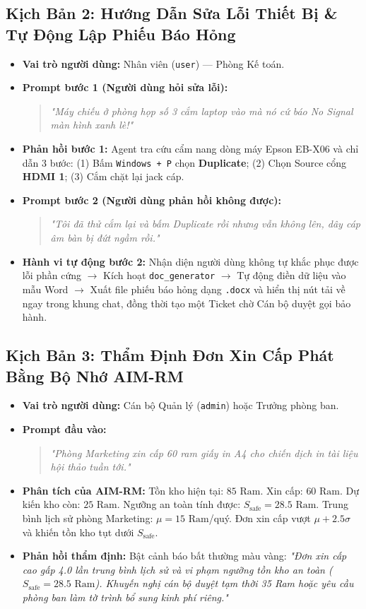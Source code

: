 \documentclass[11pt,a4paper]{article}
\begin{document}
\subsection{Kịch Bản 2: Hướng Dẫn Sửa Lỗi Thiết Bị \& Tự Động Lập Phiếu Báo Hỏng}
\begin{itemize}[leftmargin=1.5em]
    \item \textbf{Vai trò người dùng:} Nhân viên (\texttt{user}) — Phòng Kế toán.
    \item \textbf{Prompt bước 1 (Người dùng hỏi sửa lỗi):}
    \begin{quote}
    \textit{"Máy chiếu ở phòng họp số 3 cắm laptop vào mà nó cứ báo No Signal màn hình xanh lè!"}
    \end{quote}
    \item \textbf{Phản hồi bước 1:} Agent tra cứu cẩm nang dòng máy Epson EB-X06 và chỉ dẫn 3 bước: (1) Bấm \texttt{Windows + P} chọn \textbf{Duplicate}; (2) Chọn Source cổng \textbf{HDMI 1}; (3) Cắm chặt lại jack cáp.
    \item \textbf{Prompt bước 2 (Người dùng phản hồi không được):}
    \begin{quote}
    \textit{"Tôi đã thử cắm lại và bấm Duplicate rồi nhưng vẫn không lên, dây cáp âm bàn bị đứt ngầm rồi."}
    \end{quote}
    \item \textbf{Hành vi tự động bước 2:} Nhận diện người dùng không tự khắc phục được lỗi phần cứng $\rightarrow$ Kích hoạt \texttt{doc\_generator} $\rightarrow$ Tự động điền dữ liệu vào mẫu Word $\rightarrow$ Xuất file phiếu báo hỏng dạng \texttt{.docx} và hiển thị nút tải về ngay trong khung chat, đồng thời tạo một Ticket chờ Cán bộ duyệt gọi bảo hành.
\end{itemize}

\subsection{Kịch Bản 3: Thẩm Định Đơn Xin Cấp Phát Bằng Bộ Nhớ AIM-RM}
\begin{itemize}[leftmargin=1.5em]
    \item \textbf{Vai trò người dùng:} Cán bộ Quản lý (\texttt{admin}) hoặc Trưởng phòng ban.
    \item \textbf{Prompt đầu vào:}
    \begin{quote}
    \textit{"Phòng Marketing xin cấp 60 ram giấy in A4 cho chiến dịch in tài liệu hội thảo tuần tới."}
    \end{quote}
    \item \textbf{Phân tích của AIM-RM:} Tồn kho hiện tại: $85\text{ Ram}$. Xin cấp: $60\text{ Ram}$. Dự kiến kho còn: $25\text{ Ram}$. Ngưỡng an toàn tính được: $S_{\text{safe}} = 28.5\text{ Ram}$. Trung bình lịch sử phòng Marketing: $\mu = 15\text{ Ram}$/quý. Đơn xin cấp vượt $\mu + 2.5\sigma$ và khiến tồn kho tụt dưới $S_{\text{safe}}$.
    \item \textbf{Phản hồi thẩm định:} Bật cảnh báo bất thường màu vàng: \textit{"Đơn xin cấp cao gấp 4.0 lần trung bình lịch sử và vi phạm ngưỡng tồn kho an toàn ($S_{\text{safe}} = 28.5\text{ Ram}$). Khuyến nghị cán bộ duyệt tạm thời 35 Ram hoặc yêu cầu phòng ban làm tờ trình bổ sung kinh phí riêng."}
\end{itemize}
\end{document}
